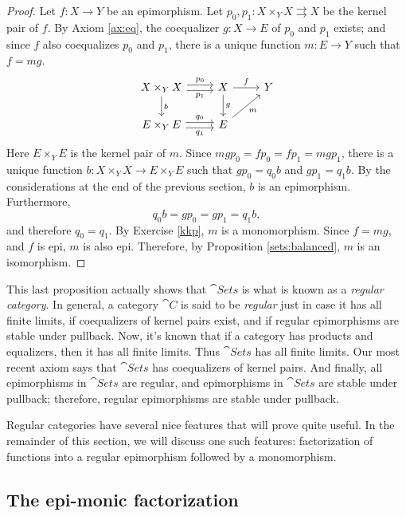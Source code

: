 \begin{proof} Let $f:X\to Y$ be an epimorphism.  Let $p_0,p_1:X\times
  _YX\rightrightarrows X$ be the kernel pair of $f$.  By Axiom
  \ref{ax:eq}, the coequalizer $g:X\to E$ of $p_0$ and $p_1$ exists;
  and since $f$ also coequalizes $p_0$ and $p_1$, there is a unique
  function $m:E\to Y$ such that $f=mg$.
  \[ \begin{tikzcd} X\times _Y X \arrow[r,shift left,"p_0"]
    \arrow[r,shift right,"p_1"']
    \arrow[d,"b"] & X \arrow[r,"f"] \arrow[d,"g"] & Y \\
    E\times _Y E \arrow[r,shift left,"q_0"] \arrow[r,shift
    right,"q_1"'] & E \arrow[ur,"m"'] \end{tikzcd} \] Here $E\times
  _YE$ is the kernel pair of $m$.  Since $mgp_0=fp_0=fp_1=mgp_1$,
  there is a unique function $b:X\times _YX\to E\times _YE$ such that
  $gp_0=q_0b$ and $gp_1=q_1b$.  By the considerations at the end of
  the previous section, $b$ is an epimorphism.  Furthermore,
  \[ q_0b = gp_0 = gp_1 = q_1b ,\] and therefore $q_0=q_1$.  By
  Exercise \ref{kkp}, $m$ is a monomorphism.  Since $f=mg$, and $f$ is
  epi, $m$ is also epi.  Therefore, by Proposition
  \ref{sets:balanced}, $m$ is an isomorphism.
\end{proof}

This last proposition actually shows that $\cat{Sets}$ is what is
known as a \emph{regular category}.  In general, a category $\cat{C}$
is said to be \emph{regular} just in case it has all finite limits, if
coequalizers of kernel pairs exist, and if regular epimorphisms are
stable under pullback.  Now, it's known that if a category has
products and equalizers, then it has all finite limits.  Thus
$\cat{Sets}$ has all finite limits.  Our most recent axiom says that
$\cat{Sets}$ has coequalizers of kernel pairs.  And finally, all
epimorphisms in $\cat{Sets}$ are regular, and epimorphisms in
$\cat{Sets}$ are stable under pullback; therefore, regular
epimorphisms are stable under pullback.

Regular categories have several nice features that will prove quite
useful.  In the remainder of this section, we will discuss one such
features: factorization of functions into a regular epimorphism
followed by a monomorphism.

\subsection*{The epi-monic factorization}

